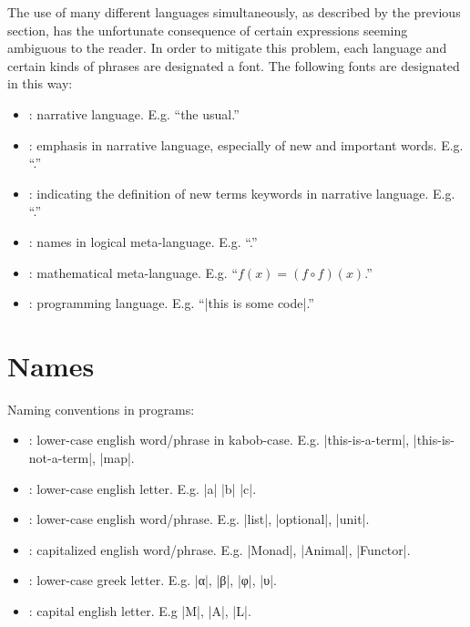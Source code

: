The use of many different languages simultaneously, as described by the previous section, has the unfortunate consequence of certain expressions seeming ambiguous to the reader.
In order to mitigate this problem, each language and certain kinds of phrases are designated a font.
The following fonts are designated in this way:
\begin{itemize}
  \item {}: narrative language. E.g. ``the usual.''
  \item {}: emphasis in narrative language, especially of new and important words. E.g. ``.''
  \item {}: indicating the definition of new terms keywords in narrative language. E.g. ``.''
  \item {}: names in logical meta-language. E.g. ``.''
  \item {}: mathematical meta-language. E.g. ``$f(x) = (f \circ f)(x)$.''
  \item {}: programming language. E.g. ``\code|this is some code|.''
\end{itemize}

\section{Names}

Naming conventions in programs:
\begin{itemize}
  \item {}: lower-case english word/phrase in kabob-case. E.g. \code|this-is-a-term|, \code|this-is-not-a-term|, \code|map|.
  \item {}: lower-case english letter. E.g. \code|a| \code|b| \code|c|.
  \item {}: lower-case english word/phrase. E.g. \code|list|, \code|optional|, \code|unit|.
  \item {}: capitalized english word/phrase. E.g. \code|Monad|, \code|Animal|, \code|Functor|.
  \item {}: lower-case greek letter. E.g. \code|α|, \code|β|, \code|φ|, \code|υ|.
  \item {}: capital english letter. E.g \code|M|, \code|A|, \code|L|.
\end{itemize}
